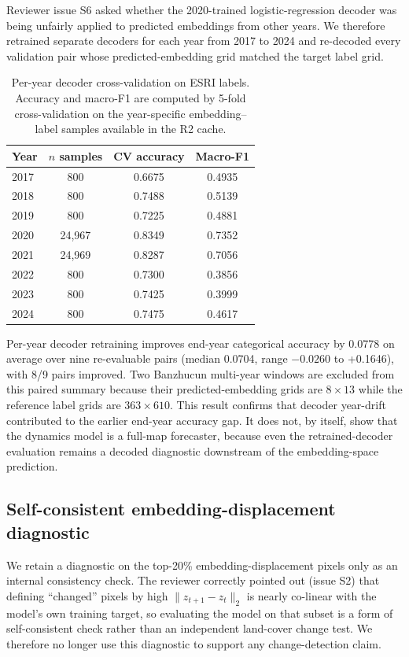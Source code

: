 \documentclass{article}
\begin{document}
Reviewer issue S6 asked whether the 2020-trained logistic-regression decoder was being unfairly applied to predicted embeddings from other years. We therefore retrained separate decoders for each year from 2017 to 2024 and re-decoded every validation pair whose predicted-embedding grid matched the target label grid.

\begin{table}[htbp]
\centering
\caption{Per-year decoder cross-validation on ESRI labels. Accuracy and macro-F1 are computed by 5-fold cross-validation on the year-specific embedding--label samples available in the R2 cache.}
\label{tab:decoder_by_year}
\small
\begin{tabular}{lccc}
\toprule
Year & $n$ samples & CV accuracy & Macro-F1 \\
\midrule
2017 & 800 & 0.6675 & 0.4935 \\
2018 & 800 & 0.7488 & 0.5139 \\
2019 & 800 & 0.7225 & 0.4881 \\
2020 & 24,967 & 0.8349 & 0.7352 \\
2021 & 24,969 & 0.8287 & 0.7056 \\
2022 & 800 & 0.7300 & 0.3856 \\
2023 & 800 & 0.7425 & 0.3999 \\
2024 & 800 & 0.7475 & 0.4617 \\
\bottomrule
\end{tabular}
\end{table}

Per-year decoder retraining improves end-year categorical accuracy by 0.0778 on average over nine re-evaluable pairs (median 0.0704, range $-0.0260$ to +0.1646), with 8/9 pairs improved. Two Banzhucun multi-year windows are excluded from this paired summary because their predicted-embedding grids are $8\times13$ while the reference label grids are $363\times610$. This result confirms that decoder year-drift contributed to the earlier end-year accuracy gap. It does not, by itself, show that the dynamics model is a full-map forecaster, because even the retrained-decoder evaluation remains a decoded diagnostic downstream of the embedding-space prediction.

\subsection{Self-consistent embedding-displacement diagnostic}
\label{sec:embedding_displacement_diagnostic}

We retain a diagnostic on the top-20\% embedding-displacement pixels only as an internal consistency check. The reviewer correctly pointed out (issue S2) that defining ``changed'' pixels by high $\|z_{t+1}-z_t\|_2$ is nearly co-linear with the model's own training target, so evaluating the model on that subset is a form of self-consistent check rather than an independent land-cover change test. We therefore no longer use this diagnostic to support any change-detection claim.
\end{document}
